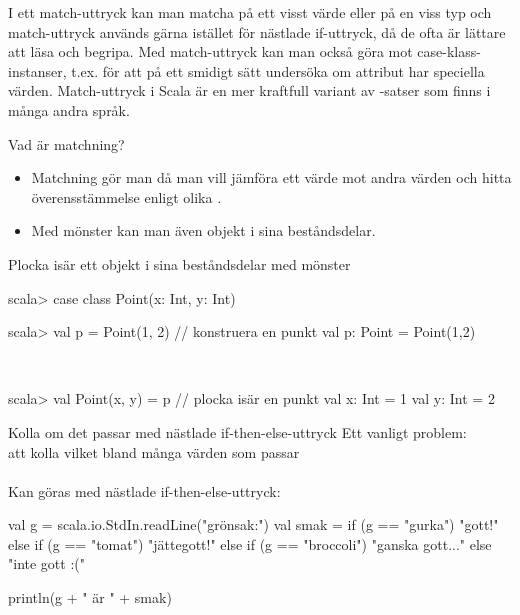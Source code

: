 


\ifkompendium
\noindent  I ett match-uttryck kan man matcha på ett visst värde eller på en viss typ och match-uttryck används gärna istället för nästlade if-uttryck, då de ofta är lättare att läsa och begripa. Med match-uttryck kan man också göra  mot case-klass-instanser, t.ex. för att på ett smidigt sätt undersöka om attribut har speciella värden. Match-uttryck i Scala är en mer kraftfull variant av -satser som finns i många andra språk.  
\fi

\begin{Slide}{Vad är matchning?}

  \begin{itemize}
    \item Matchning gör man då man vill jämföra ett värde mot andra värden och hitta överensstämmelse  enligt olika .
    \item Med mönster kan man även  objekt i sina beståndsdelar.
  \end{itemize}
\end{Slide}

\begin{Slide}{Plocka isär ett objekt i sina beståndsdelar med mönster}

\begin{REPLnonum}
scala> case class Point(x: Int, y: Int)

scala> val p = Point(1, 2)      // konstruera en punkt
val p: Point = Point(1,2)
\end{REPLnonum}

\pause 

~\\
\begin{REPLnonum}
scala> val Point(x, y) = p      // plocka isär en punkt
val x: Int = 1
val y: Int = 2
  
\end{REPLnonum}
\end{Slide}


\begin{Slide}{Kolla om det passar med nästlade if-then-else-uttryck}
Ett vanligt problem: \\ att kolla vilket bland många värden som passar \\~\\

Kan göras med nästlade if-then-else-uttryck:

\begin{Code}
val g = scala.io.StdIn.readLine("grönsak:")
val smak =
  if (g == "gurka") "gott!"
  else if (g == "tomat") "jättegott!"
  else if (g == "broccoli") "ganska gott..."
  else "inte gott :("

println(g + " är " + smak)
\end{Code}
      
\end{Slide}


